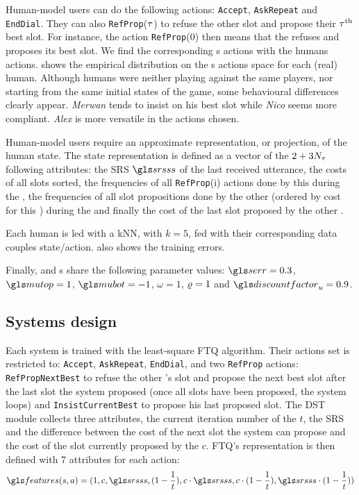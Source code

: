 Human-model users can do the following actions: \texttt{Accept}, \texttt{AskRepeat} and \texttt{EndDial}. They can also \texttt{RefProp}($\tau$) to refuse the other  slot and propose their $\tau^\text{th}$ best slot. For instance, the action \texttt{RefProp}(0) then means that the  refuses and proposes its best slot. We find the corresponding s actions with the humans actions.  shows the empirical distribution on the s actions space for each (real) human. Although humans were neither playing against the same players, nor starting from the same initial states of the game, some behavioural differences clearly appear. \textit{Merwan} tends to insist on his best slot while \textit{Nico} seems more compliant. \textit{Alex} is more versatile in the actions chosen.

Human-model users  require an approximate representation, or projection, of the human state. The  state representation is defined as a vector of the $2 + 3 N_{\tau}$  following attributes: the \gls{SRS} $\srs$ of the last received utterance, the costs of all slots sorted, the frequencies of all \texttt{RefProp}(i) actions done by this  during the , the frequencies of all slot propositions done by the other  (ordered by cost for this ) during the  and finally the cost of the last slot proposed by the other .

Each human is led with a \gls{kNN}, with $k=5$, fed with their corresponding data couples state/action.  also shows the training errors.

Finally,  and s share the following parameter values: $\ser=0.3$, $\mutop=1$, $\mubot=-1$, $\omega=1$, $\varrho=1$ and $\discountfactor_u = 0.9$.

\subsection{Systems design}
\label{subsection:systemdesign}

Each system is trained with the least-square \gls{FTQ} algorithm. Their actions set is restricted to: \texttt{Accept}, \texttt{AskRepeat}, \texttt{EndDial}, and two \texttt{RefProp} actions: \texttt{RefPropNextBest} to refuse the other 's slot and propose the next best slot after the last slot the system proposed (once all slots have been proposed, the system loops) and \texttt{InsistCurrentBest} to propose his last proposed slot. The \gls{DST} module collects three attributes, the current iteration number of the  $t$, the \gls{SRS} and the difference between the cost of the next slot the system can propose and the cost of the slot currently proposed by the  $c$. \gls{FTQ}'s  representation is then defined with 7 attributes for each action:
\begin{equation*}
    \features(s,a)=(1, c, \srs, (1 - \frac{1}{t}), c \cdot \srs, c \cdot (1 - \frac{1}{t}) , \srs \cdot (1 - \frac{1}{t}))
\end{equation*}

